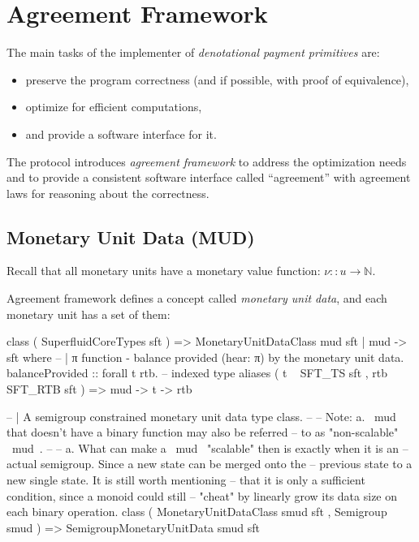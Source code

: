 \section{Agreement Framework}

The main tasks of the implementer of \textit{denotational payment primitives} are:

\begin{itemize}
    \item preserve the program correctness (and if possible, with proof of equivalence),
    \item optimize for efficient computations,
    \item and provide a software interface for it.
\end{itemize}

The protocol introduces \textit{agreement framework} to address the optimization needs and to
provide a consistent software interface called ``agreement'' with agreement laws for reasoning about
the correctness.

\subsection{Monetary Unit Data (MUD)}

Recall that all monetary units have a monetary value function: $ \nu :: u \rightarrow \mathbb{N}$.

Agreement framework defines a concept called \textit{monetary unit data}, and each monetary unit has
a set of them:

\begin{code}
class ( SuperfluidCoreTypes sft
      ) => MonetaryUnitDataClass mud sft | mud -> sft where
    -- | π function - balance provided (hear: π) by the monetary unit data.
    balanceProvided
        :: forall t rtb.
           -- indexed type aliases
           ( t ~ SFT_TS sft
           , rtb ~ SFT_RTB sft
           )
        => mud -> t -> rtb

-- | A semigroup constrained monetary unit data type class.
--
-- Note: a. ~mud~ that doesn't have a binary function may also be referred
--          to as "non-scalable" ~mud~.
--
--       a. What can make a ~mud~ "scalable" then is exactly when it is an
--          actual semigroup. Since a new state can be merged onto the
--          previous state to a new single state. It is still worth mentioning
--          that it is only a sufficient condition, since a monoid could still
--          "cheat" by linearly grow its data size on each binary operation.
class ( MonetaryUnitDataClass smud sft
      , Semigroup smud
      ) => SemigroupMonetaryUnitData smud sft
\end{code}

